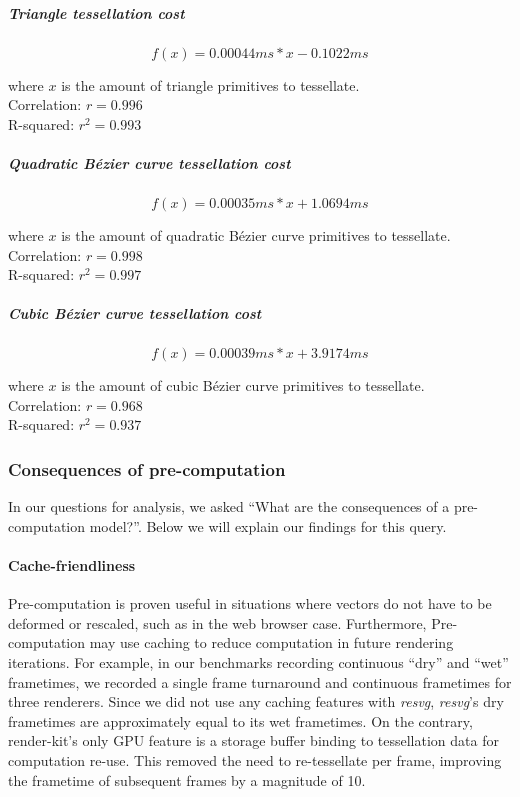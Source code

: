 \subparagraph{Triangle tessellation cost}
\begin{equation}\label{eq:tesscost_triangle}
f(x)=0.00044ms*x-0.1022ms
\end{equation}
\begin{center}
where \(x\) is the amount of triangle primitives to tessellate.\\
Correlation: \(r=0.996\)\\
R-squared:	\(r^2=0.993\)
\end{center}

\subparagraph{Quadratic Bézier curve tessellation cost}
\begin{equation}\label{eq:tesscost_quadratic_bezier}
f(x)=0.00035ms*x+1.0694ms
\end{equation}
\begin{center}
where \(x\) is the amount of quadratic Bézier curve primitives to tessellate.\\
Correlation: \(r=0.998\)\\
R-squared:	\(r^2=0.997\)
\end{center}

\subparagraph{Cubic Bézier curve tessellation cost}
\begin{equation}\label{eq:tesscost_cubic_bezier}
f(x)=0.00039ms*x+3.9174ms
\end{equation}
\begin{center}
where \(x\) is the amount of cubic Bézier curve primitives to tessellate.\\
Correlation: \(r=0.968\)\\
R-squared:	\(r^2=0.937\)
\end{center}

\subsubsection{Consequences of pre-computation}
In our questions for analysis, we asked ``What are the consequences of a pre-computation model?''. Below we will explain our findings for this query.\medskip

\paragraph{Cache-friendliness}
Pre-computation is proven useful in situations where vectors do not have to be deformed or rescaled, such as in the web browser case. Furthermore, Pre-computation may use caching to reduce computation in future rendering iterations. For example, in our benchmarks recording continuous ``dry'' and ``wet'' frametimes, we recorded a single frame turnaround and continuous frametimes for three renderers. Since we did not use any caching features with \textit{resvg}, \textit{resvg}'s dry frametimes are approximately equal to its wet frametimes. On the contrary, render-kit's only GPU feature is a storage buffer binding to tessellation data for computation re-use. This removed the need to re-tessellate per frame, improving the frametime of subsequent frames by a magnitude of 10.

